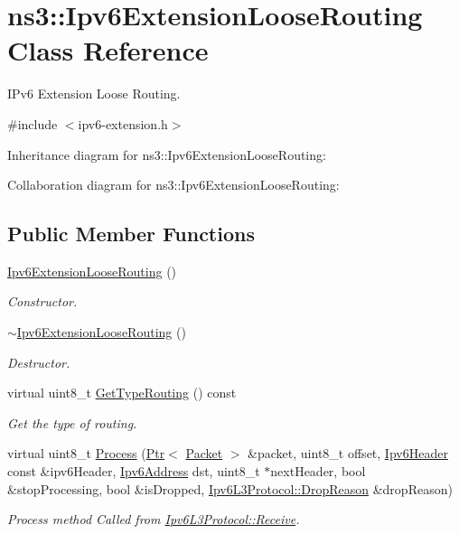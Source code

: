 \hypertarget{classns3_1_1Ipv6ExtensionLooseRouting}{}\section{ns3\+:\+:Ipv6\+Extension\+Loose\+Routing Class Reference}
\label{classns3_1_1Ipv6ExtensionLooseRouting}


I\+Pv6 Extension Loose Routing.  




{\ttfamily \#include $<$ipv6-\/extension.\+h$>$}



Inheritance diagram for ns3\+:\+:Ipv6\+Extension\+Loose\+Routing\+:


Collaboration diagram for ns3\+:\+:Ipv6\+Extension\+Loose\+Routing\+:
\subsection*{Public Member Functions}
\begin{DoxyCompactItemize}
\item 
\hyperlink{classns3_1_1Ipv6ExtensionLooseRouting_ab6fcd7643a16a0027483cfc2f95ad161}{Ipv6\+Extension\+Loose\+Routing} ()
\begin{DoxyCompactList}\small\item\em Constructor. \end{DoxyCompactList}\item 
\hyperlink{classns3_1_1Ipv6ExtensionLooseRouting_aac112fd0374afbe7a858925e68f9797c}{$\sim$\+Ipv6\+Extension\+Loose\+Routing} ()
\begin{DoxyCompactList}\small\item\em Destructor. \end{DoxyCompactList}\item 
virtual uint8\+\_\+t \hyperlink{classns3_1_1Ipv6ExtensionLooseRouting_ae81cd568a93b9723736c7231f7c55204}{Get\+Type\+Routing} () const 
\begin{DoxyCompactList}\small\item\em Get the type of routing. \end{DoxyCompactList}\item 
virtual uint8\+\_\+t \hyperlink{classns3_1_1Ipv6ExtensionLooseRouting_ab73c109952d780d1eb52c2f7c144e546}{Process} (\hyperlink{classns3_1_1Ptr}{Ptr}$<$ \hyperlink{classns3_1_1Packet}{Packet} $>$ \&packet, uint8\+\_\+t offset, \hyperlink{classns3_1_1Ipv6Header}{Ipv6\+Header} const \&ipv6\+Header, \hyperlink{classns3_1_1Ipv6Address}{Ipv6\+Address} dst, uint8\+\_\+t $\ast$next\+Header, bool \&stop\+Processing, bool \&is\+Dropped, \hyperlink{classns3_1_1Ipv6L3Protocol_a33c64db9bc35f71ff368b132bfffa37a}{Ipv6\+L3\+Protocol\+::\+Drop\+Reason} \&drop\+Reason)
\begin{DoxyCompactList}\small\item\em Process method Called from \hyperlink{classns3_1_1Ipv6L3Protocol_a8a95d576e8aee9a571db93bf686d850a}{Ipv6\+L3\+Protocol\+::\+Receive}. \end{DoxyCompactList}\end{DoxyCompactItemize}
